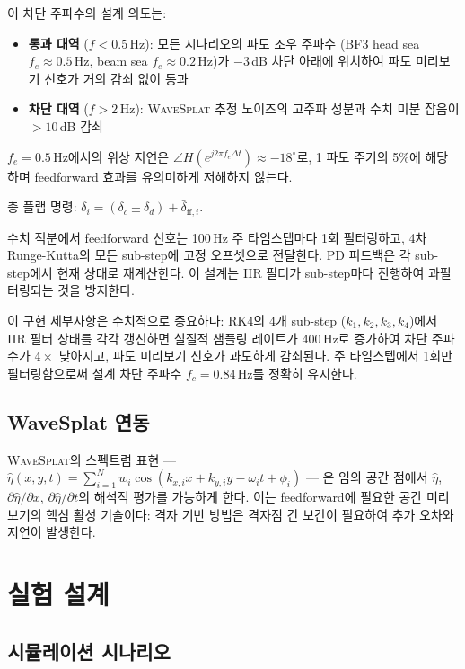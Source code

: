 \documentclass[11pt]{report}
\numberwithin{equation}{chapter}
\numberwithin{figure}{chapter}
\numberwithin{table}{chapter}
\newcommand{\WS}{\textsc{WaveSplat}}
\begin{document}
이 차단 주파수의 설계 의도는:
\begin{itemize}
  \item \textbf{통과 대역} ($f < 0.5$\,Hz): 모든 시나리오의 파도 조우 주파수
        (BF3 head sea $f_e \approx 0.5$\,Hz, beam sea $f_e \approx 0.2$\,Hz)가
        $-3$\,dB 차단 아래에 위치하여 파도 미리보기 신호가 거의 감쇠 없이 통과
  \item \textbf{차단 대역} ($f > 2$\,Hz): \WS{} 추정 노이즈의 고주파 성분과
        수치 미분 잡음이 $> 10$\,dB 감쇠
\end{itemize}
$f_e = 0.5$\,Hz에서의 위상 지연은 $\angle H(e^{j2\pi f_e \Delta t})
\approx -18^\circ$로, 1 파도 주기의 5\%에 해당하며 feedforward 효과를
유의미하게 저해하지 않는다.

총 플랩 명령: $\delta_i = (\delta_c \pm \delta_d) + \bar{\delta}_{\text{ff},i}$.

수치 적분에서 feedforward 신호는 100\,Hz 주 타임스텝마다 1회 필터링하고,
4차 Runge-Kutta의 모든 sub-step에 고정 오프셋으로 전달한다.
PD 피드백은 각 sub-step에서 현재 상태로 재계산한다.
이 설계는 IIR 필터가 sub-step마다 진행하여 과필터링되는 것을 방지한다.

이 구현 세부사항은 수치적으로 중요하다: RK4의 4개 sub-step
($k_1, k_2, k_3, k_4$)에서 IIR 필터 상태를 각각 갱신하면
실질적 샘플링 레이트가 400\,Hz로 증가하여 차단 주파수가
$4\times$ 낮아지고, 파도 미리보기 신호가 과도하게 감쇠된다.
주 타임스텝에서 1회만 필터링함으로써 설계 차단 주파수 $f_c = 0.84$\,Hz를
정확히 유지한다.

\subsection{WaveSplat 연동}

\WS{}의 스펙트럼 표현 ---
$\hat{\eta}(x,y,t) = \sum_{i=1}^{N} w_i \cos(k_{x,i} x + k_{y,i} y - \omega_i t + \phi_i)$
--- 은 임의 공간 점에서 $\hat{\eta}$, $\partial\hat{\eta}/\partial x$,
$\partial\hat{\eta}/\partial t$의 해석적 평가를 가능하게 한다.
이는 feedforward에 필요한 공간 미리보기의 핵심 활성 기술이다:
격자 기반 방법은 격자점 간 보간이 필요하여 추가 오차와 지연이 발생한다.

\section{실험 설계}
\label{sec:hydrofoil_exp}

\subsection{시뮬레이션 시나리오}
\end{document}
